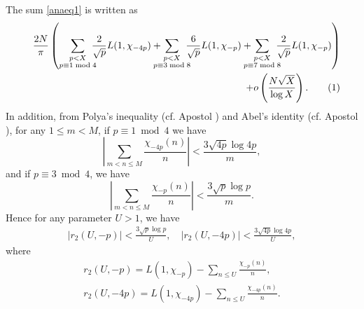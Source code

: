 \documentclass[a4paper, 11pt]{article}
\theoremstyle{plain}
\newcommand{\?}{\textcolor{red}{??}}
\begin{document}
The sum \eqref{anaeq1} is written as 
\begin{align*}
\label{anaeq2}
  && \frac{2N}{\pi} \left(  \sum_{\substack{p<X \\ p \equiv 1 \bmod 4}}\!\! \!\! \frac{2}{\sqrt{p}}L(1,{\chi}_{-4p})+ \!\! \!\! \!\! \sum_{\substack{p<X \\ p \equiv 3\bmod 8 }} \!\! \!\!  \frac{6}{\sqrt{p}}L(1,{\chi}_{-p}) + \!\! \!\! \!\!  \sum_{\substack{p<X \\ p \equiv 7 \bmod 8}} \!\! \!\!  \frac{2}{\sqrt{p}}L(1,{\chi}_{-p}) \right)\\
  &&+ o \left( \frac{N\sqrt{X}}{\log X} \right).
  \stepcounter{equation}\tag{\theequation} 
\end{align*}
In addition, from Polya's inequality (cf. Apostol \cite[Theorem 8.21]{Apo}) and Abel's identity (cf. Apostol \cite[Theorem 4.2]{Apo}), for any $1 \le m <M$,
if $p \equiv 1 \bmod 4$ we have
    \[
    \left| \sum_{m< n \le M} \frac{{\chi}_{-4p} (n)}{n} \right| < \frac{3\sqrt{4p}\log 4p}{m},
    \]
  and if $p \equiv 3 \bmod 4$, we have 
     \[
    \left| \sum_{m< n \le M} \frac{{\chi}_{-p} (n)}{n} \right| < \frac{3\sqrt{p}\log p}{m}.
    \]
Hence for any parameter $U>1$, we have
\begin{eqnarray}
\label{polyabel}
     \left| r_2(U,-p) \right| < \frac{3\sqrt{p}\log p}{U}, \quad \left| r_2(U,-4p)\right| < \frac{3\sqrt{4p}\log 4p}{U},
\end{eqnarray}
where 
\begin{eqnarray*}
    r_2(U,-p)=L(1,{\chi}_{-p})- \sum_{n \le U}\frac{{\chi}_{-p}(n)}{n},\\
    r_2(U,-4p)=L(1,{\chi}_{-4p})- \sum_{n \le U}\frac{{\chi}_{-4p}(n)}{n}.
\end{eqnarray*}
\end{document}
